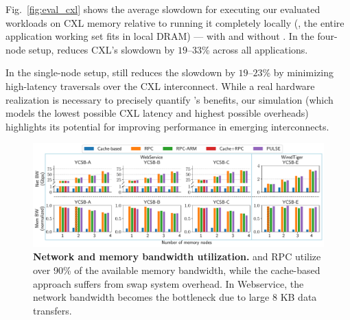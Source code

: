  
Fig.~\ref{fig:eval_cxl} shows the average slowdown for executing our evaluated workloads on CXL memory relative to running it completely locally (\ie, the entire application working set fits in local DRAM) --- with and without \pulse. In the four-node setup, \pulse reduces CXL's slowdown by $19$--$33$\% across all applications. 

In the single-node setup, \pulse still reduces the slowdown by $19$--$23$\% by minimizing high-latency traversals over the CXL interconnect. While a real hardware realization is necessary to precisely quantify \pulse's benefits, our simulation (which models the lowest possible CXL latency and highest possible \pulse overheads) highlights its potential for improving performance in emerging interconnects.

\begin{figure}[t]
\centering
  \includegraphics[width=\textwidth]{fig/pulse/network_memory.pdf}
  \caption[Network and memory bandwidth utilization]{\textbf{Network and memory bandwidth utilization.} \pulse and RPC utilize over 90\% of the available memory bandwidth, while the cache-based approach suffers from swap system overhead. In Webservice, the network bandwidth becomes the bottleneck due to large 8 KB data transfers.}
\label{fig:sup_eval_perf_e2e_utilization}
\end{figure}

